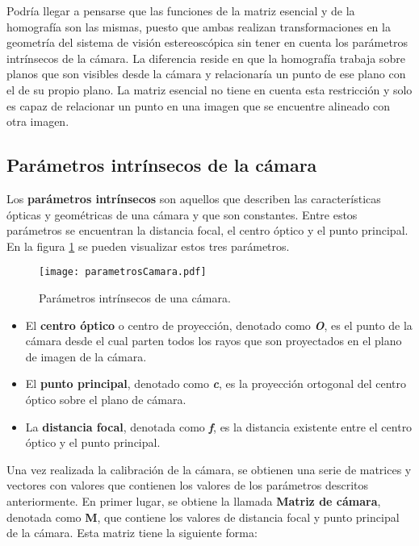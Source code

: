 Podría llegar a pensarse que las funciones de la matriz esencial y de la homografía son las mismas,
puesto que ambas realizan transformaciones en la geometría del sistema de visión estereoscópica sin tener en cuenta los parámetros intrínsecos de la cámara. La diferencia reside en que la homografía trabaja sobre planos que son visibles desde la cámara y relacionaría un punto de ese plano con el de su propio plano. La matriz esencial no tiene en cuenta esta restricción y solo es capaz de relacionar un punto en una imagen que se encuentre alineado con otra imagen.

\subsection{Parámetros intrínsecos de la cámara}

Los \textbf{parámetros intrínsecos} son aquellos que describen las características
ópticas y geométricas de una cámara y que son constantes. Entre estos parámetros se encuentran la distancia focal, el centro óptico y el punto principal. En la figura \ref{fig:FIGparamCam} se pueden visualizar estos tres parámetros.

\begin{figure}[h!]
  \centering
  \texttt{[image: parametrosCamara.pdf]}
  \caption{Parámetros intrínsecos de una cámara.}
  \label{fig:FIGparamCam}
\end{figure}

\begin{itemize}
\item El \textbf{centro óptico} o centro de proyección, denotado como \textbf{\textit{O}},  es el punto de la cámara desde el cual parten todos los rayos que son proyectados en el plano de imagen de la cámara.
\item El \textbf{punto principal}, denotado como \textbf{\textit{c}}, es la proyección ortogonal del centro óptico sobre el plano de cámara.
\item La \textbf{distancia focal}, denotada como \textbf{\textit{f}}, es la distancia existente entre el centro óptico y el punto principal.
\end{itemize}

Una vez realizada la calibración de la cámara, se obtienen una serie de matrices y vectores con valores que contienen los valores de los parámetros descritos anteriormente. En primer lugar, se obtiene la llamada \textbf{Matriz de cámara}, denotada como \textbf{M}, que contiene los valores de distancia focal y punto principal de la cámara. Esta matriz tiene la si\-guiente forma:

